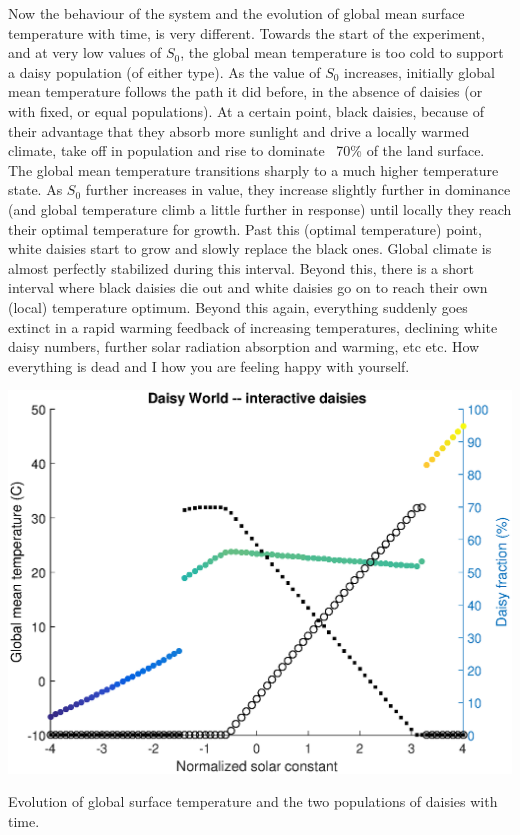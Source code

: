 \documentclass{tufte-book} %
\begin{document}
Now the behaviour of the system and the evolution of global mean surface temperature with time, is very different. Towards the start of the experiment, and at very low values of \(S_{0}\), the global mean temperature is too cold to support a daisy population (of either type). As the value of \(S_{0}\) increases, initially global mean temperature follows the path it did before, in the absence of daisies (or with fixed, or equal populations). At a certain point, black daisies, because of their advantage that they absorb more sunlight and drive a locally warmed climate, take off in population and rise to dominate ~70\% of the land surface. The global mean temperature transitions sharply to a much higher temperature state. As \(S_{0}\) further increases in value, they increase slightly further in dominance (and global temperature climb a little further in response) until locally they reach their optimal temperature for growth. Past this (optimal temperature) point, white daisies start to grow and slowly replace the black ones. Global climate is almost perfectly stabilized during this interval. Beyond this, there is a short interval where black daisies die out and white daisies go on to reach their own (local) temperature optimum. Beyond this again, everything suddenly goes extinct in a rapid warming feedback of increasing temperatures, declining white daisy numbers, further solar radiation absorption and warming, etc etc. How everything is dead and I how you are feeling happy with yourself.

\begin{marginfigure}[0.0in]
\includegraphics[width=\linewidth]{ch4-daisy-model3.eps}
\caption{Evolution of global surface temperature and the two populations of daisies with time.}
\label{fig:ch4-daisy-model3}
\end{marginfigure}
\end{document}
